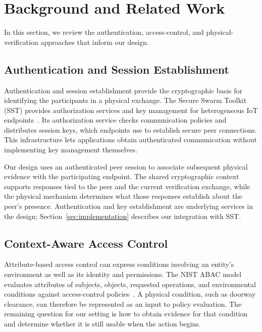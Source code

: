 \documentclass[sigconf,authordraft]{acmart}
\begin{document}
\section{Background and Related Work}
\label{sec:related-work}

In this section, we review the authentication, access-control, and physical-verification approaches that inform our design.

\subsection{Authentication and Session Establishment}

Authentication and session establishment provide the cryptographic basis for identifying the participants in a physical exchange.
The Secure Swarm Toolkit (SST) provides authorization services and key management for heterogeneous IoT endpoints~\cite{kim2017toolkit}.
Its authorization service checks communication policies and distributes session keys, which endpoints use to establish secure peer connections.
This infrastructure lets applications obtain authenticated communication without implementing key management themselves.

Our design uses an authenticated peer session to associate subsequent physical evidence with the participating endpoint.
The shared cryptographic context supports responses tied to the peer and the current verification exchange, while the physical mechanism determines what those responses establish about the peer's presence.
Authentication and key establishment are underlying services in the design; Section~\ref{sec:implementation} describes our integration with SST.

\subsection{Context-Aware Access Control}

Attribute-based access control can express conditions involving an entity's environment as well as its identity and permissions.
The NIST ABAC model evaluates attributes of subjects, objects, requested operations, and environmental conditions against access-control policies~\cite{hu2013guide}.
A physical condition, such as doorway clearance, can therefore be represented as an input to policy evaluation.
The remaining question for our setting is how to obtain evidence for that condition and determine whether it is still usable when the action begins.
\end{document}
